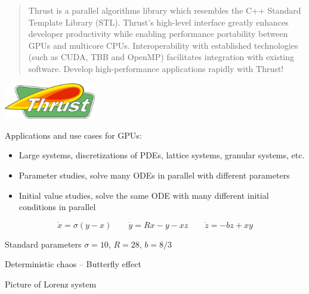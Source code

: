 \begin{frame}[fragile]


\vspace{4ex}
\begin{quotation}
Thrust is a parallel algorithms library which resembles the C++ Standard Template Library (STL). Thrust's high-level interface greatly enhances developer productivity while enabling performance portability between GPUs and multicore CPUs. Interoperability with established technologies (such as CUDA, TBB and OpenMP) facilitates integration with existing software. Develop high-performance applications rapidly with Thrust!
\end{quotation}

\vspace{2ex}

\centerline{\includegraphics[draft=false,width=0.3\textwidth]{thrust_logo.png}}
 

\end{frame}


\begin{frame}[fragile]
 

\vspace{2ex}
Applications and use cases for GPUs:

\begin{itemize}
 \item Large systems, discretizations of PDEs, lattice systems, granular systems, etc.
 \item Parameter studies, solve many ODEs in parallel with different parameters
 \item Initial value studies, solve the same ODE with many different initial conditions in parallel
\end{itemize}


\end{frame}



\begin{frame}[fragile]
 

 $$
  \dot{x} = \sigma ( y - x ) \quad \quad \dot{y} = R x - y - x z \quad \quad \dot{z} = -b z + x y
 $$

Standard parameters $\sigma=10$, $R=28$, $b=8/3$

\vspace{2ex}
Deterministic chaos -- Butterfly effect


Picture of Lorenz system

\end{frame}


